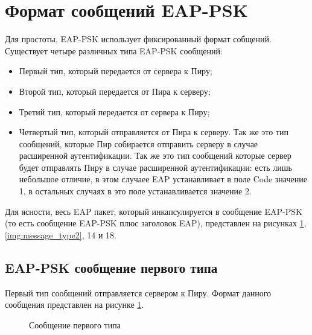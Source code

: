 \newpage
\section{Формат сообщений EAP-PSK}

Для простоты, EAP-PSK использует фиксированный формат собщений. Существует четыре различных типа EAP-PSK сообщений:

\begin{itemize}
\item Первый тип, который передается от сервера к Пиру;
\item Второй тип, который передается от Пира к серверу;
\item Третий тип, который передается от сервера к Пиру;
\item Четвертый тип, который отправляется от Пира к серверу. Так же это тип сообщений, которые Пир собирается отправить серверу в случае расширенной аутентификации. Так же это тип сообщений которые сервер будет отправлять Пиру в случае расширенной аутентификации: есть лишь небольшое отличие, в этом случаее EAP устанавливает в поле Code значение 1, в остальных случаях в это поле устанавливается значение 2.
\end{itemize}

Для ясности, весь EAP пакет, который инкапсулируется в сообщение EAP-PSK (то есть сообщение EAP-PSK плюс заголовок EAP), представлен на рисунках \ref{img:message_type1}, \ref{img:message_type2}, 14 и 18. %

\subsection{EAP-PSK сообщение первого типа}

Первый тип сообщений отправляется сервером к Пиру. Формат данного сообщения представлен на рисунке \ref{img:message_type1}.

\begin{figure}[h!]
\caption{Сообщение первого типа}
\label{img:message_type1}
\end{figure}

